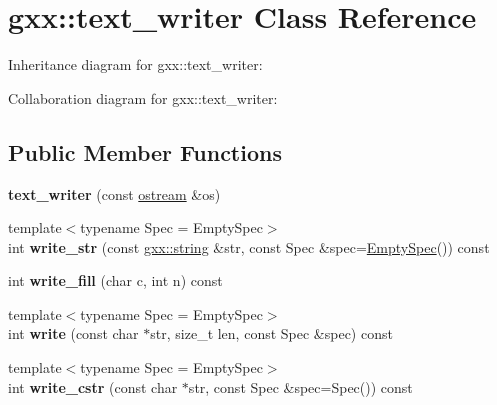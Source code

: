 \hypertarget{classgxx_1_1text__writer}{}\section{gxx\+:\+:text\+\_\+writer Class Reference}
\label{classgxx_1_1text__writer}


Inheritance diagram for gxx\+:\+:text\+\_\+writer\+:


Collaboration diagram for gxx\+:\+:text\+\_\+writer\+:
\subsection*{Public Member Functions}
\begin{DoxyCompactItemize}
\item 
{\bfseries text\+\_\+writer} (const \hyperlink{classgxx_1_1ostream}{ostream} \&os)\hypertarget{classgxx_1_1text__writer_af97ed20f689f57a1505c8eee2455102f}{}\label{classgxx_1_1text__writer_af97ed20f689f57a1505c8eee2455102f}

\item 
{\footnotesize template$<$typename Spec  = Empty\+Spec$>$ }\\int {\bfseries write\+\_\+str} (const \hyperlink{classgxx_1_1basic__string}{gxx\+::string} \&str, const Spec \&spec=\hyperlink{classgxx_1_1EmptySpec}{Empty\+Spec}()) const \hypertarget{classgxx_1_1text__writer_aadd74461e568af8b5b48834f1a8c5323}{}\label{classgxx_1_1text__writer_aadd74461e568af8b5b48834f1a8c5323}

\item 
int {\bfseries write\+\_\+fill} (char c, int n) const \hypertarget{classgxx_1_1text__writer_aa344d318a8c2aca0070d4017cb987adf}{}\label{classgxx_1_1text__writer_aa344d318a8c2aca0070d4017cb987adf}

\item 
{\footnotesize template$<$typename Spec  = Empty\+Spec$>$ }\\int {\bfseries write} (const char $\ast$str, size\+\_\+t len, const Spec \&spec) const \hypertarget{classgxx_1_1text__writer_a6bbfa32a5f91175280599174c932f2c7}{}\label{classgxx_1_1text__writer_a6bbfa32a5f91175280599174c932f2c7}

\item 
{\footnotesize template$<$typename Spec  = Empty\+Spec$>$ }\\int {\bfseries write\+\_\+cstr} (const char $\ast$str, const Spec \&spec=Spec()) const \hypertarget{classgxx_1_1text__writer_a4374a959e770eb9acedc85a569d18d2c}{}\label{classgxx_1_1text__writer_a4374a959e770eb9acedc85a569d18d2c}


\end{DoxyCompactItemize}
